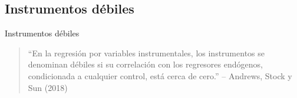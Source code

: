 \documentclass{beamer}
\begin{document}




	



\subsection{Instrumentos débiles}

\begin{frame}{Instrumentos débiles}

\begin{quote}
``En la regresión por variables instrumentales, los instrumentos se denominan débiles si su correlación con los regresores endógenos, condicionada a cualquier control, está cerca de cero.'' -- Andrews, Stock y Sun (2018)
\end{quote}

\end{frame}
\end{document}
